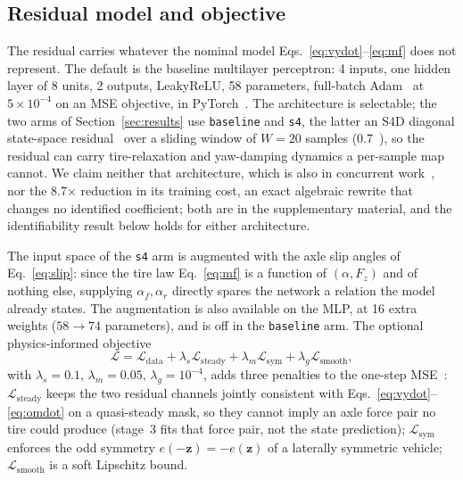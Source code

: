 \documentclass[lineno,12pt]{sn-jnl}
\makeatletter
\newif\ifsiu@prev
\DeclareRobustCommand{\siu@sep}{\ifsiu@prev\,\fi}
\DeclareRobustCommand{\siu@unit}[1]{\siu@sep\text{#1}\siu@prevtrue}
\DeclareRobustCommand{\siu@pre}[1]{\siu@sep\text{#1}\siu@prevfalse}
\DeclareRobustCommand{\siu@div}[1]{\text{#1}\siu@prevfalse}
\DeclareRobustCommand{\meter}{m}
\DeclareRobustCommand{\second}{s}
\DeclareRobustCommand{\gram}{g}
\DeclareRobustCommand{\newton}{N}
\DeclareRobustCommand{\radian}{rad}
\DeclareRobustCommand{\hertz}{Hz}
\DeclareRobustCommand{\percent}{\%}
\DeclareRobustCommand{\g}{\textit{g}}
\DeclareRobustCommand{\kilo}{k}
\DeclareRobustCommand{\milli}{m}
\DeclareRobustCommand{\per}{/}
\DeclareRobustCommand{\squared}{\ensuremath{^{2}}}
\providecommand{\degree}{\ensuremath{^{\circ}}}
\DeclareRobustCommand{\si}[1]{\begingroup
  \siu@prevfalse
  \renewcommand{\meter}{\siu@unit{m}}%
  \renewcommand{\second}{\siu@unit{s}}%
  \renewcommand{\gram}{\siu@unit{g}}%
  \renewcommand{\newton}{\siu@unit{N}}%
  \renewcommand{\radian}{\siu@unit{rad}}%
  \renewcommand{\hertz}{\siu@unit{Hz}}%
  \renewcommand{\percent}{\siu@unit{\%}}%
  \renewcommand{\degree}{\siu@unit{\ensuremath{^{\circ}}}}%
  \renewcommand{\g}{\siu@unit{\textit{g}}}%
  \renewcommand{\kilo}{\siu@pre{k}}%
  \renewcommand{\milli}{\siu@pre{m}}%
  \renewcommand{\per}{\siu@div{/}}%
  \renewcommand{\squared}{\ensuremath{^{2}}}%
  #1\endgroup}
\DeclareRobustCommand{\num}[1]{#1}
\DeclareRobustCommand{\SI}[2]{#1\,\si{#2}}
\newcommand{\vecz}{\mathbf{z}}
\theoremstyle{thmstyleone}%
\theoremstyle{thmstyletwo}%
\theoremstyle{thmstylethree}%
\makeatother
\begin{document}
\subsection{Residual model and objective}
\label{subsec:physinputs}

The residual carries whatever the nominal model
Eqs.~\eqref{eq:vydot}--\eqref{eq:mf} does not represent. The default is the baseline
multilayer perceptron: 4 inputs, one hidden layer of 8 units, 2 outputs,
LeakyReLU, 58 parameters, full-batch Adam~\cite{kingma2015adam} at
$5\times10^{-4}$ on an MSE objective, in PyTorch~\cite{paszke2019pytorch}. The
architecture is selectable; the two arms of Section~\ref{sec:results} use
\texttt{baseline} and \texttt{s4}, the latter an S4D diagonal state-space
residual~\cite{gu2022s4d} over a sliding window of $W=20$ samples
(\SI{0.7}{\second}), so the residual can carry tire-relaxation and yaw-damping
dynamics a per-sample map cannot. We claim neither that architecture, which is
also in concurrent work~\cite{visionsysid2026}, nor the \num{8.7}$\times$
reduction in its training cost, an exact algebraic rewrite that changes no
identified coefficient; both are in the supplementary material, and the
identifiability result below holds for either architecture.

The input space of the \texttt{s4} arm is augmented with the axle slip angles
of Eq.~\eqref{eq:slip}: since the tire law Eq.~\eqref{eq:mf} is a function of
$(\alpha,F_{z})$ and of nothing else, supplying $\alpha_{f},\alpha_{r}$
directly spares the network a relation the model already states. The
augmentation is also available on the MLP, at 16 extra weights
($58\rightarrow74$ parameters), and is off in the \texttt{baseline} arm. The optional physics-informed objective
\begin{equation}
\mathcal{L}=\mathcal{L}_{\mathrm{data}}
+\lambda_{s}\mathcal{L}_{\mathrm{steady}}
+\lambda_{m}\mathcal{L}_{\mathrm{sym}}
+\lambda_{g}\mathcal{L}_{\mathrm{smooth}},
\label{eq:pinnloss}
\end{equation}
with $\lambda_{s}=0.1$, $\lambda_{m}=0.05$, $\lambda_{g}=10^{-4}$, adds three
penalties to the one-step MSE~\cite{raissi2019pinn,deepdynamics2024}:
$\mathcal{L}_{\mathrm{steady}}$ keeps the two residual channels jointly
consistent with Eqs.~\eqref{eq:vydot}--\eqref{eq:omdot} on a quasi-steady mask, so
they cannot imply an axle force pair no tire could produce (stage~3 fits that
force pair, not the state prediction);
$\mathcal{L}_{\mathrm{sym}}$ enforces the odd symmetry $e(-\vecz)=-e(\vecz)$ of
a laterally symmetric vehicle; $\mathcal{L}_{\mathrm{smooth}}$ is a soft
Lipschitz bound.
\end{document}
